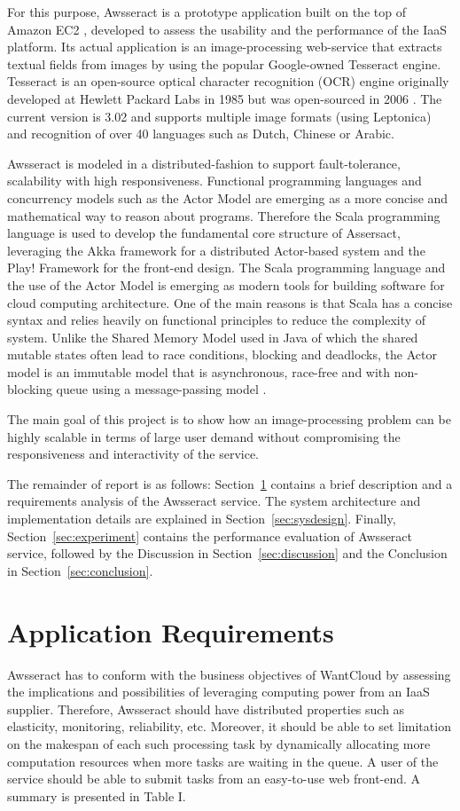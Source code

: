 \documentclass[conference]{IEEEtran}
\begin{document}
For this purpose, Awsseract is a prototype application built on the top of Amazon EC2 \cite{amazon}, developed to assess the usability and the performance of the IaaS platform. Its actual application is an image-processing web-service that extracts textual fields from images by using the popular Google-owned Tesseract engine. Tesseract is an open-source optical character recognition (OCR) engine originally developed at Hewlett Packard Labs in 1985 but was open-sourced in 2006 \cite{tess}.  The current version is 3.02 and supports multiple image formats (using Leptonica) and recognition of over 40 languages such as Dutch, Chinese or Arabic.

Awsseract is modeled in a distributed-fashion to support fault-tolerance, scalability with high responsiveness. Functional programming languages and concurrency models such as the Actor Model are emerging as a more concise and mathematical way to reason about programs. Therefore the Scala programming language is used to develop the fundamental core structure of Assersact, leveraging the Akka framework for a distributed Actor-based system and the Play! Framework for the front-end design.  The Scala programming language and the use of the Actor Model is emerging as modern tools for building software for cloud computing architecture. One of the main reasons is that Scala has a concise syntax and relies heavily on functional principles to reduce the complexity of system. Unlike the Shared Memory Model used in Java of which the shared mutable states often lead to race conditions, blocking and deadlocks, the Actor model is an immutable model that is asynchronous, race-free and with non-blocking queue using a message-passing model \cite{akka}.
        
The main goal of this project is to show how an image-processing problem can be highly scalable in terms of large user demand without compromising the responsiveness and interactivity of the service. 

The remainder of report is as follows: Section~\ref{sec:bg} contains a brief description and a requirements analysis of the Awsseract service. The system architecture and implementation details are explained in Section~\ref{sec:sysdesign}. Finally, Section~\ref{sec:experiment} contains the performance evaluation of Awsseract service, followed by the Discussion in Section~\ref{sec:discussion} and the Conclusion in Section~\ref{sec:conclusion}.


\section{Application Requirements}\label{sec:bg}
\noindent
Awsseract has to conform with the business objectives of WantCloud by assessing the implications and possibilities of leveraging computing power from an IaaS supplier. Therefore, Awsseract should have distributed properties such as elasticity, monitoring, reliability, etc. Moreover, it should be able to set limitation on the makespan of each such processing task by dynamically allocating more computation resources when more tasks are waiting in the queue. A user of the service should be able to submit tasks from an easy-to-use web front-end. A summary is presented in Table I.
\end{document}
